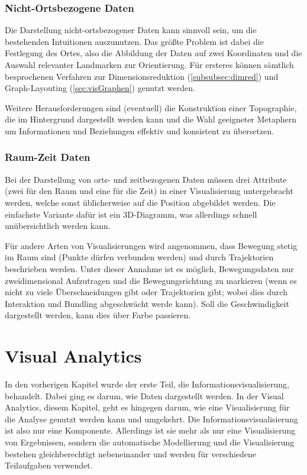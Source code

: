 		\subsection{Nicht-Ortsbezogene Daten}
			Die Darstellung nicht-ortsbezogener Daten kann \zB sinnvoll sein, um die bestehenden Intuitionen auszunutzen. Das größte Problem ist dabei die Festlegung des Ortes, also die Abbildung der Daten auf zwei Koordinaten und die Auswahl relevanter Landmarken zur Orientierung. Für ersteres können sämtlich besprochenen Verfahren zur Dimensionsreduktion (\autoref{subsubsec:dimred}) und Graph-Layouting (\autoref{sec:visGraphen}) genutzt werden.

			Weitere Herausforderungen sind (eventuell) die Konstruktion einer Topographie, die im Hintergrund dargestellt werden kann und die Wahl geeigneter Metaphern um Informationen und Beziehungen effektiv und konsistent zu übersetzen.

		\subsection{Raum-Zeit Daten}
			Bei der Darstellung von orts- und zeitbezogenen Daten müssen drei Attribute (zwei für den Raum und eine für die Zeit) in einer Visualisierung untergebracht werden, welche sonst üblicherweise auf die Position abgebildet werden. Die einfachste Variante dafür ist ein 3D-Diagramm, was allerdings schnell unübersichtlich werden kann.

			Für andere Arten von Visualisierungen wird angenommen, dass Bewegung stetig im Raum sind (\dh Punkte dürfen verbunden werden) und durch Trajektorien beschrieben werden. Unter dieser Annahme ist es möglich, Bewegungsdaten nur zweidimensional Aufzutragen und die Bewegungsrichtung zu markieren (wenn es nicht zu viele Überschneidungen gibt oder Trajektorien gibt; wobei dies durch Interaktion und Bundling abgeschwächt werde kann). Soll die Geschwindigkeit dargestellt werden, kann dies \bspw über Farbe passieren.

\chapter{Visual Analytics}
	In den vorherigen Kapitel wurde der erste Teil, die Informationsvisualisierung, behandelt. Dabei ging es darum, wie Daten dargestellt werden. In der Visual Analytics, diesem Kapitel, geht es hingegen darum, wie eine Visualisierung für die Analyse genutzt werden kann und umgekehrt. Die Informationsvisualisierung ist also nur eine Komponente. Allerdings ist sie mehr als nur eine Visualisierung von Ergebnissen, sondern die automatische Modellierung und die Visualisierung bestehen gleichberechtigt nebeneinander und werden für verschiedene Teilaufgaben verwendet.

